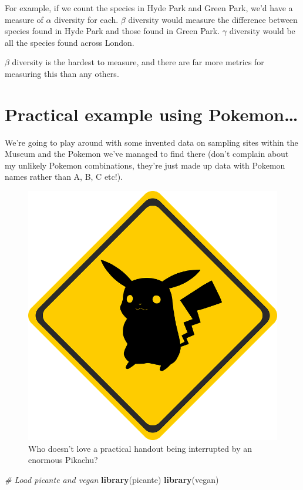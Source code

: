 \documentclass[]{book}
\newenvironment{Shaded}{\begin{snugshade}}{\end{snugshade}}
\newcommand{\KeywordTok}[1]{\textcolor[rgb]{0.13,0.29,0.53}{\textbf{{#1}}}}
\newcommand{\CommentTok}[1]{\textcolor[rgb]{0.56,0.35,0.01}{\textit{{#1}}}}
\newcommand{\NormalTok}[1]{{#1}}
\theoremstyle{definition}
\theoremstyle{definition}
\theoremstyle{definition}
\theoremstyle{remark}
\begin{document}
For example, if we count the species in Hyde Park and Green Park, we'd
have a measure of \(\alpha\) diversity for each. \(\beta\) diversity
would measure the difference between species found in Hyde Park and
those found in Green Park. \(\gamma\) diversity would be all the species
found across London.

\(\beta\) diversity is the hardest to measure, and there are far more
metrics for measuring this than any others.

\section{Practical example using
Pokemon\ldots{}}\label{practical-example-using-pokemon}

We're going to play around with some invented data on sampling sites
within the Museum and the Pokemon we've managed to find there (don't
complain about my unlikely Pokemon combinations, they're just made up
data with Pokemon names rather than A, B, C etc!).

\begin{figure}
\centering
\includegraphics{pokemon.png}
\caption{Who doesn't love a practical handout being interrupted by an
enormous Pikachu?}
\end{figure}

\begin{Shaded}
\begin{Highlighting}[]
\CommentTok{# Load picante and vegan}
\KeywordTok{library}\NormalTok{(picante)}
\KeywordTok{library}\NormalTok{(vegan)}
\end{Highlighting}
\end{Shaded}
\end{document}
